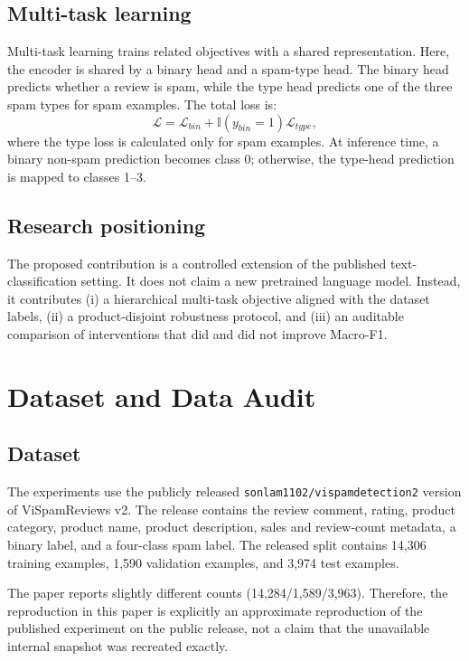 \documentclass[runningheads]{llncs}
\begin{document}
\subsection{Multi-task learning}
Multi-task learning trains related objectives with a shared representation\cite{multitask}. Here, the encoder is shared by a binary head and a spam-type head. The binary head predicts whether a review is spam, while the type head predicts one of the three spam types for spam examples. The total loss is:
\begin{equation}
\mathcal{L}=\mathcal{L}_{bin}+\mathbb{I}(y_{bin}=1)\mathcal{L}_{type},
\end{equation}
where the type loss is calculated only for spam examples. At inference time, a binary non-spam prediction becomes class 0; otherwise, the type-head prediction is mapped to classes 1--3.

\subsection{Research positioning}
The proposed contribution is a controlled extension of the published text-classification setting. It does not claim a new pretrained language model. Instead, it contributes (i) a hierarchical multi-task objective aligned with the dataset labels, (ii) a product-disjoint robustness protocol, and (iii) an auditable comparison of interventions that did and did not improve Macro-F1.

\section{Dataset and Data Audit}
\subsection{Dataset}
The experiments use the publicly released \texttt{sonlam1102/vispamdetection2} version of ViSpamReviews v2. The release contains the review comment, rating, product category, product name, product description, sales and review-count metadata, a binary label, and a four-class spam label. The released split contains 14,306 training examples, 1,590 validation examples, and 3,974 test examples.

The paper reports slightly different counts (14,284/1,589/3,963). Therefore, the reproduction in this paper is explicitly an approximate reproduction of the published experiment on the public release, not a claim that the unavailable internal snapshot was recreated exactly.
\end{document}
